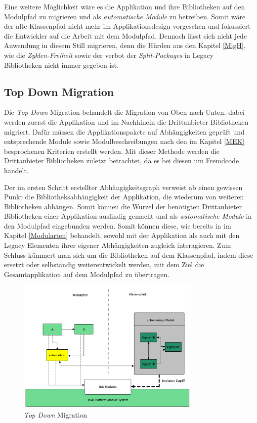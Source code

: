 	Eine weitere Möglichkeit wäre es die Applikation und ihre Bibliotheken auf den Modulpfad zu migrieren und als \textit{automatische Module} zu betreiben. Somit wäre der alte Klassenpfad  nicht mehr im Applikationsdesign vorgesehen und fokussiert die Entwickler auf die Arbeit mit dem Modulpfad. Dennoch lässt sich nicht jede Anwendung in diesem Still migrieren, denn die Hürden aus den Kapitel \ref{MigH}, wie die \textit{Zyklen-Freiheit} sowie der verbot der \textit{Split-Packages} in Legacy Bibliotheken nicht immer gegeben ist. 



\subsection{Top Down Migration}

	Die \textit{Top-Down} Migration behandelt die Migration von Oben nach Unten, dabei werden zuerst die Applikation und im Nachhinein die Drittanbieter Bibliotheken migriert. Dafür müssen die Applikationspakete auf Abhängigkeiten geprüft und entsprechende Module sowie Modulbeschreibungen nach den im Kapitel \ref{MEK} besprochenen Kriterien erstellt werden. Mit dieser Methode werden die Drittanbieter Bibliotheken zuletzt betrachtet, da es bei diesen um Fremdcode handelt. 


	Der im ersten Schritt erstellter Abhängigkeitsgraph verweist ab einen gewissen Punkt die Bibliotheksabhängigkeit der Applikation, die wiederum von weiteren Bibliotheken abhängen. Somit können die Wurzel der benötigten Drittanbieter Bibliotheken einer Applikation ausfindig gemacht und als \textit{automatische Module} in den Modulpfad eingebunden werden. Somit können diese, wie bereits in im Kapitel \ref{Modularten} behandelt, sowohl mit der Applikation als auch mit den Legacy Elementen ihrer eigener Abhängigkeiten zugleich interagieren. Zum Schluss kümmert man sich um die Bibliotheken auf dem Klassenpfad, indem diese ersetzt oder selbständig weiterentwickelt werden, mit dem Ziel die Gesamtapplikation auf dem Modulpfad zu übertragen. \bigbreak

	\begin{figure}[h]
		\centering
	    \includegraphics[width=0.8\textwidth]{material/images/top-down-migration.png}
	    \caption{\textit{Top Down} Migration}
	    \label{fig:TDM}
  	\end{figure}

